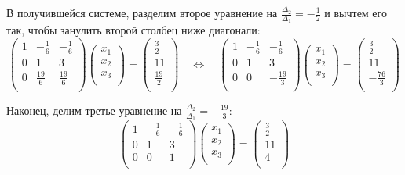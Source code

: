 \documentclass{article}
\begin{document}
\begin{example}
	В получившейся системе, разделим второе уравнение на
	$\frac{\Delta_2}{\Delta_1}=-\frac{1}{2}$ и вычтем его так, чтобы
	занулить второй столбец ниже диагонали:
	\[
		\begin{pmatrix}
			1	&-\frac{1}{6}	& -\frac{1}{6}	\\
			0	& 1	& 3	\\
			0	& \frac{19}{6}	& \frac{19}{6}	\\
		\end{pmatrix}
		\begin{pmatrix}
			x_1 \\
			x_2 \\
			x_3 \\
		\end{pmatrix}
		=
		\begin{pmatrix}
			\frac{3}{2} \\
			11 \\
			\frac{19}{2} \\
		\end{pmatrix}
		\quad\Leftrightarrow\quad
		\begin{pmatrix}
			1	&-\frac{1}{6}	& -\frac{1}{6}	\\
			0	& 1	& 3	\\
			0	& 0	& -\frac{19}{3}	\\
		\end{pmatrix}
		\begin{pmatrix}
			x_1 \\
			x_2 \\
			x_3 \\
		\end{pmatrix}
		=
		\begin{pmatrix}
			\frac{3}{2} \\
			11 \\
			-\frac{76}{3} \\
		\end{pmatrix}
	\]

	Наконец, делим третье уравнение на $\frac{\Delta_2}{\Delta_1}=
	-\frac{19}{3}$:
	\[
		\begin{pmatrix}
			1	&-\frac{1}{6}	& -\frac{1}{6}	\\
			0	& 1	& 3	\\
			0	& 0	& 1	\\
		\end{pmatrix}
		\begin{pmatrix}
			x_1 \\
			x_2 \\
			x_3 \\
		\end{pmatrix}
		=
		\begin{pmatrix}
			\frac{3}{2} \\
			11 \\
			4 \\
		\end{pmatrix}
	\]


\end{example}
\end{document}
